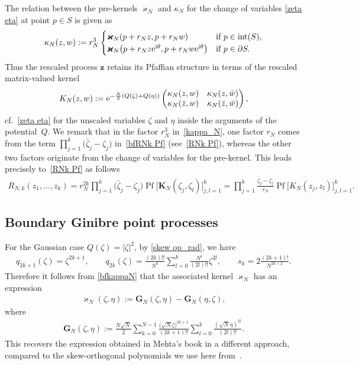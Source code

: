 \documentclass[pdftex]{sigma}
\numberwithin{equation}{section}
\newcommand{\bfK}{{\mathbf K}}
\newcommand{\bfkappa}{{\bm \varkappa}}
\newcommand{\1}{\chi}
\newcommand{\Pf}{{\operatorname{Pf}}}
\begin{document}
The relation between the pre-kernels $\bfkappa_N$ and $\kappa_N$
for the change of variables \eqref{zeta eta}
at point $p\in S$ is given as
\begin{gather} \label{kappa_N}
	\kappa_N(z,w):=r_N^3
	\begin{cases}
		\bfkappa_N( p+r_Nz, p+r_Nw) &\text{if } p \in \textup{int}(S),
		\\
	\bfkappa_N\big( p+r_Nz {\rm e}^{{\rm i}\theta}, p+r_Nw {\rm e}^{{\rm i}\theta} \big)&\text{if } p \in \partial S.
	\end{cases} 	
\end{gather}
Thus the rescaled process $\boldsymbol{z}$ retains its Pfaffian structure in terms of the rescaled matrix-valued kernel
\begin{gather} \label{K_N}
	K_N(z,w):={\rm e}^{ -\frac{N}{2} (Q( \zeta )+Q( \eta )) } \begin{pmatrix}
		\kappa_N(z,w) & \kappa_N(z,\bar{w}) \\
		\kappa_N(\bar{z},w) & \kappa_N(\bar{z},\bar{w})
	\end{pmatrix},
\end{gather}
cf.~\eqref{zeta eta} for the unscaled variables $\zeta$ and $\eta$ inside the arguments of the potential~$Q$. We remark that in the factor $r_N^3$ in~\eqref{kappa_N}, one factor $r_N$ comes from the term $\prod_{j=1}^k \big(\bar{\zeta}_j-\zeta_j\big)$ in~\eqref{bfRNk Pf} (see~\eqref{RNk Pf}), whereas the other two factors originate from the change of variables for the pre-kernel. This leads precisely to~\eqref{RNk Pf} as follows
	\begin{gather*}
		 R_{N,k}(z_1,\dots, z_k)
		 = 	r_N^{2k} \prod_{j=1}^{k} \big(\bar{\zeta}_j-\zeta_j\big) \Pf \big[ \bfK_{N}(\zeta_j,\zeta_l) \big]_{ j,l=1 }^k
		= \prod_{j=1}^{k} \frac{\bar{\zeta}_j-\zeta_j}{r_N} \Pf \big[ K_{N}(z_j,z_l) \big]_{ j,l=1 }^k.
	\end{gather*}

\subsection{Boundary Ginibre point processes}\label{Subsec_bdy Ginibre}
For the Gaussian case $Q(\zeta)=|\zeta|^2$, by \eqref{skew op_rad}, we have
\begin{gather*}
	q_{2k+1}(\zeta)=\zeta^{2k+1}, \qquad q_{2k}(\zeta)=\frac{(2k)!!}{N^k} \sum_{l=0}^k \frac{N^l}{(2l)!!} \zeta^{2l}, \qquad s_k=2\frac{(2k+1)!}{N^{2k+2}}.
\end{gather*}
Therefore it follows from \eqref{bfkappaN} that the associated kernel $\bfkappa_N$ has an expression
\begin{gather}\label{bfkappa_N Gaussian}
	\bfkappa_N(\zeta,\eta):=\boldsymbol{G}_N(\zeta,\eta)-\boldsymbol{G}_N(\eta,\zeta),
\end{gather}
where
\begin{gather*}
\boldsymbol{G}_N(\zeta,\eta):=\frac{N\sqrt{N}}{2} \sum_{k=0}^{N-1} \frac{ \big(\sqrt{N}\zeta\big)^{2k+1}}{(2k+1)!!} \sum_{l=0}^k \frac{ (\sqrt{N}\eta) ^{2l}}{(2l)!!}.
\end{gather*}
This recovers the expression obtained in Mehta's book \cite{Mehta} in a different approach, compared to the skew-orthogonal polynomials we use here from~\cite{MR1928853}.
\end{document}
